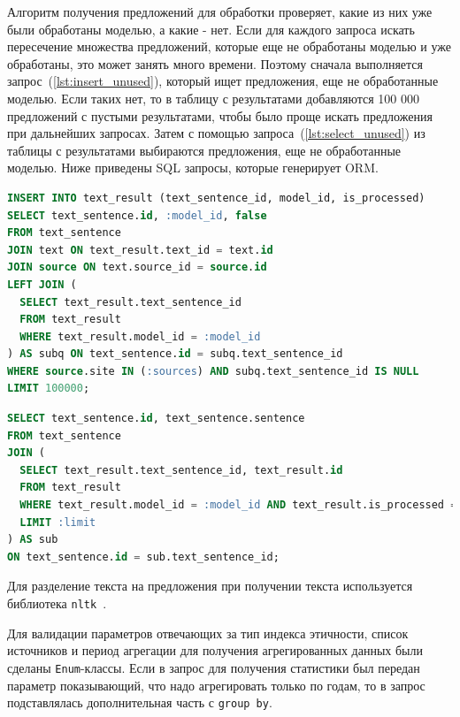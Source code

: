\documentclass[PI, VKR]{HSEUniversity}
\begin{document}
Алгоритм получения предложений для обработки проверяет, какие из них уже были обработаны моделью, а какие - нет. Если для каждого запроса искать пересечение множества предложений, которые еще не обработаны моделью и уже обработаны, это может занять много времени. Поэтому сначала выполняется запрос~(\ref{lst:insert_unused}), который ищет предложения, еще не обработанные моделью. Если таких нет, то в таблицу с результатами добавляются 100 000 предложений с пустыми результатами, чтобы было проще искать предложения при дальнейших запросах. Затем с помощью запроса~(\ref{lst:select_unused}) из таблицы с результатами выбираются предложения, еще не обработанные моделью. Ниже приведены SQL запросы, которые генерирует ORM.

\begin{lstlisting}[language=SQL,label=lst:insert_unused,caption={SQL запрос на вставку не обработанных предложений},captionpos=b,numbers=none]
INSERT INTO text_result (text_sentence_id, model_id, is_processed)
SELECT text_sentence.id, :model_id, false
FROM text_sentence
JOIN text ON text_result.text_id = text.id
JOIN source ON text.source_id = source.id
LEFT JOIN (
  SELECT text_result.text_sentence_id
  FROM text_result
  WHERE text_result.model_id = :model_id
) AS subq ON text_sentence.id = subq.text_sentence_id
WHERE source.site IN (:sources) AND subq.text_sentence_id IS NULL
LIMIT 100000;
\end{lstlisting}

\begin{lstlisting}[language=SQL,label=lst:select_unused,caption={SQL запрос на получение еще не обработанных предложений},captionpos=b,numbers=none]
SELECT text_sentence.id, text_sentence.sentence
FROM text_sentence
JOIN (
  SELECT text_result.text_sentence_id, text_result.id
  FROM text_result
  WHERE text_result.model_id = :model_id AND text_result.is_processed = false
  LIMIT :limit
) AS sub
ON text_sentence.id = sub.text_sentence_id;
\end{lstlisting}

Для разделение текста на предложения при получении текста используется библиотека \texttt{nltk}~\autocite{bird_natural_2009}.

Для валидации параметров отвечающих за тип индекса этичности, список источников и период агрегации для получения агрегированных данных были сделаны \texttt{Enum}-классы. Если в запрос для получения статистики был передан параметр показывающий, что надо агрегировать только по годам, то в запрос подставлялась дополнительная часть с \texttt{group by}.
\end{document}
